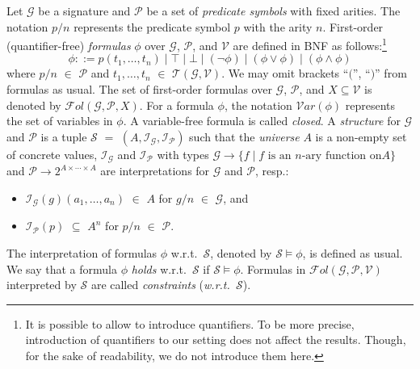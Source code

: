\documentclass[copyright,creativecommons]{eptcs}
\newcommand{\cG}{\mathcal{G}}
\newcommand{\cI}{\mathcal{I}}
\newcommand{\cP}{\mathcal{P}}
\newcommand{\cS}{\mathcal{S}}
\newcommand{\cV}{\mathcal{V}}
\newcommand{\Var}{{\mathcal{V}ar}}
\newcommand{\Terms}{{\mathcal{T}}}
\newcommand{\Fol}{{\mathcal{F}\!\mathit{ol}}}
\begin{document}
Let $\cG$ be a signature and $\cP$ be a set of \emph{predicate symbols}
with fixed arities.
The notation $p/n$ represents the predicate symbol $p$ with the arity
$n$. 
First-order (quantifier-free) \emph{formulas} $\phi$ over $\cG$, $\cP$, 
and $\cV$ are defined in BNF as follows:\footnote{ It is possible to allow to introduce quantifiers.
To be more precise, introduction of quantifiers to our setting does not
affect the results. 
Though, for the sake of readability, we do not introduce them here. }
\[
  \phi ::= p(t_1,\ldots,t_n) \mid \top \mid \bot \mid (\neg \phi) \mid
 (\phi \vee \phi) \mid (\phi \wedge \phi)
\]
where $p/n$ $\in$ $\cP$ and $t_1,\ldots,t_n$ $\in$ $\Terms(\cG,\cV)$.
We may omit brackets ``$($'', ``$)$'' from formulas as usual. 
The set of first-order formulas over $\cG$, $\cP$, and $X \subseteq \cV$
is denoted by $\Fol(\cG,\cP,X)$.
For a formula $\phi$, the notation $\Var(\phi)$ represents the set of
variables in $\phi$.  
A variable-free formula is called \emph{closed}.
A \emph{structure} for $\cG$ and $\cP$ 
is a tuple $\cS$ $=$ $(A,\cI_\cG,\cI_\cP)$ such that the \emph{universe}
$A$ is a non-empty set of concrete values, $\cI_\cG$ and $\cI_\cP$ 
with types $\cG \to \{ f \mid \mbox{$f$ is an $n$-ary function on
$A$}\}$ and $\cP \to 2^{A\times \cdots \times A}$
are interpretations for $\cG$ and $\cP$, resp.:
\begin{itemize}
 \item $\cI_\cG(g)(a_1,\ldots,a_n)$ $\in$ $A$ for $g/n$ $\in$ $\cG$, and
 \item $\cI_\cP(p)$ $\subseteq$ $A^n$ for $p/n$ $\in$ $\cP$.
\end{itemize}
The interpretation of formulas $\phi$ w.r.t.\ $\cS$, denoted by $\cS
\models \phi$, is defined as usual.
We say that a formula $\phi$ \emph{holds} w.r.t.\ $\cS$ if $\cS \models \phi$.
Formulas in $\Fol(\cG,\cP,\cV)$ interpreted by $\cS$ are called
\emph{constraints} (\emph{w.r.t.\ $\cS$}).
\end{document}
